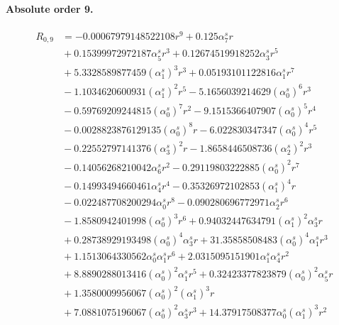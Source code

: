 \documentclass[10pt]{article}
\begin{document}
\paragraph{Absolute order 9.}
\begin{align*}
R_{0,9} &=  - 0.00067979148522108 r^{9} + 0.125 \alpha_{7}^s r \\
&{}  + 0.15399972972187 \alpha_{5}^s r^{3} + 0.12674519918252 \alpha_{3}^s r^{5} \\
&{}  + 5.3328589877459 \left(\alpha_{1}^s\right)^{3} r^{3} + 0.05193101122816 \alpha_{1}^s r^{7} \\
&{}  - 1.1034620600931 \left(\alpha_{1}^s\right)^{2} r^{5} - 5.1656039214629 \left(\alpha_{0}^s\right)^{6} r^{3} \\
&{}  - 0.59769209244815 \left(\alpha_{0}^s\right)^{7} r^{2} - 9.1515366407907 \left(\alpha_{0}^s\right)^{5} r^{4} \\
&{}  - 0.0028823876129135 \left(\alpha_{0}^s\right)^{8} r - 6.022830347347 \left(\alpha_{0}^s\right)^{4} r^{5} \\
&{}  - 0.22552797141376 \left(\alpha_{3}^s\right)^{2} r - 1.8658446508736 \left(\alpha_{2}^s\right)^{2} r^{3} \\
&{}  - 0.14056268210042 \alpha_{6}^s r^{2} - 0.29119803222885 \left(\alpha_{0}^s\right)^{2} r^{7} \\
&{}  - 0.14993494660461 \alpha_{4}^s r^{4} - 0.35326972102853 \left(\alpha_{1}^s\right)^{4} r \\
&{}  - 0.022487708200294 \alpha_{0}^s r^{8} - 0.090280696772971 \alpha_{2}^s r^{6} \\
&{}  - 1.8580942401998 \left(\alpha_{0}^s\right)^{3} r^{6} + 0.94032447634791 \left(\alpha_{1}^s\right)^{2} \alpha_{3}^s r \\
&{}  + 0.28738929193498 \left(\alpha_{0}^s\right)^{4} \alpha_{3}^s r + 31.35858508483 \left(\alpha_{0}^s\right)^{4} \alpha_{1}^s r^{3} \\
&{}  + 1.1513064330562 \alpha_{0}^s \alpha_{1}^s r^{6} + 2.0315095151901 \alpha_{1}^s \alpha_{4}^s r^{2} \\
&{}  + 8.8890288013416 \left(\alpha_{0}^s\right)^{2} \alpha_{1}^s r^{5} + 0.32423377823879 \left(\alpha_{0}^s\right)^{2} \alpha_{5}^s r \\
&{}  + 1.3580009956067 \left(\alpha_{0}^s\right)^{2} \left(\alpha_{1}^s\right)^{3} r \\
&{}  + 7.0881075196067 \left(\alpha_{0}^s\right)^{2} \alpha_{3}^s r^{3} + 14.37917508377 \alpha_{0}^s \left(\alpha_{1}^s\right)^{3} r^{2} \\

\end{align*}
\end{document}
